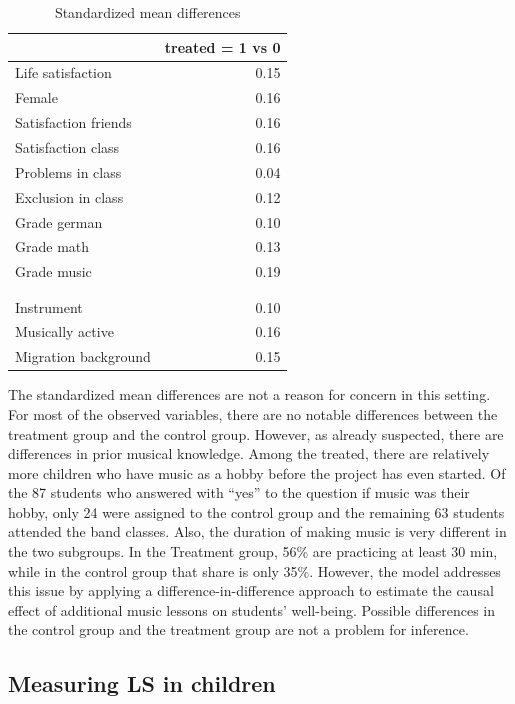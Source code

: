 \documentclass[a4, 12pt]{article}
\begin{document}
\begin{table}[H]

\caption{\label{tab:std-mean-diff}Standardized mean differences}
\centering
\begin{tabular}[t]{lr}
\toprule
  & treated = 1 vs 0\\
\midrule
Life satisfaction & 0.15\\
Female & 0.16\\
Satisfaction friends & 0.16\\
Satisfaction class & 0.16\\
Problems in class & 0.04\\
\addlinespace
Exclusion in class & 0.12\\
Grade german & 0.10\\
Grade math & 0.13\\
Grade music & 0.19\\
\cellcolor[HTML]{b3cde0}{Hobby music} & \cellcolor[HTML]{b3cde0}{0.54}\\
\addlinespace
\cellcolor[HTML]{b3cde0}{Duration music} & \cellcolor[HTML]{b3cde0}{0.45}\\
Instrument & 0.10\\
Musically active & 0.16\\
Migration background & 0.15\\
\bottomrule
\end{tabular}
\end{table}

The standardized mean differences are not a reason for concern in this setting. For most of the observed variables, there are no notable differences between the treatment group and the control group. However, as already suspected, there are differences in prior musical knowledge. Among the treated, there are relatively more children who have music as a hobby before the project has even started. Of the 87 students who answered with ``yes'' to the question if music was their hobby, only 24 were assigned to the control group and the remaining 63 students attended the band classes. Also, the duration of making music is very different in the two subgroups. In the Treatment group, 56\% are practicing at least 30 min, while in the control group that share is only 35\%. However, the model addresses this issue by applying a difference-in-difference approach to estimate the causal effect of additional music lessons on students' well-being. Possible differences in the control group and the treatment group are not a problem for inference.

\hypertarget{measuring-ls-in-children}{%
\subsection{Measuring LS in children}\label{measuring-ls-in-children}}
\end{document}
